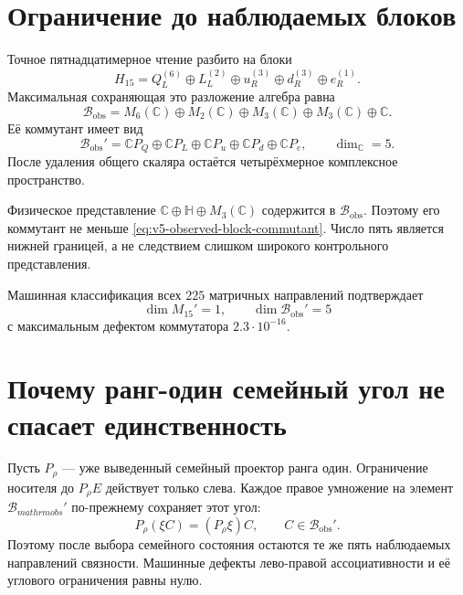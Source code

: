 \section{Ограничение до наблюдаемых блоков}

Точное пятнадцатимерное чтение разбито на блоки
\begin{equation}
 H_{15}=Q_L^{(6)}\oplus L_L^{(2)}\oplus u_R^{(3)}
 \oplus d_R^{(3)}\oplus e_R^{(1)}.
\end{equation}
Максимальная сохраняющая это разложение алгебра равна
\begin{equation}
 \mathcal B_{\mathrm{obs}}
 =M_6(\mathbb C)\oplus M_2(\mathbb C)
 \oplus M_3(\mathbb C)\oplus M_3(\mathbb C)\oplus\mathbb C.
\end{equation}
Её коммутант имеет вид
\begin{equation}
 \mathcal B_{\mathrm{obs}}'
 =\mathbb CP_Q\oplus\mathbb CP_L\oplus\mathbb CP_u
 \oplus\mathbb CP_d\oplus\mathbb CP_e,
 \qquad \dim_{\mathbb C}=5.
 \label{eq:v5-observed-block-commutant}
\end{equation}
После удаления общего скаляра остаётся четырёхмерное комплексное
пространство.

Физическое представление
$\mathbb C\oplus\mathbb H\oplus M_3(\mathbb C)$ содержится в
$\mathcal B_{\mathrm{obs}}$. Поэтому его коммутант не меньше
\eqref{eq:v5-observed-block-commutant}. Число пять является нижней границей,
а не следствием слишком широкого контрольного представления.

Машинная классификация всех $225$ матричных направлений подтверждает
\begin{equation}
 \dim M_{15}'=1,
 \qquad
 \dim\mathcal B_{\mathrm{obs}}'=5
\end{equation}
с максимальным дефектом коммутатора $2.3\cdot10^{-16}$.

\section{Почему ранг-один семейный угол не спасает единственность}

Пусть $P_\rho$ --- уже выведенный семейный проектор ранга один. Ограничение
носителя до $P_\rho E$ действует только слева. Каждое правое умножение на
элемент $\mathcal B_{mathrm{obs}}'$ по-прежнему сохраняет этот угол:
\begin{equation}
 P_\rho(\xi C)=(P_\rho\xi)C,
 \qquad C\in\mathcal B_{\mathrm{obs}}'.
\end{equation}
Поэтому после выбора семейного состояния остаются те же пять наблюдаемых
направлений связности. Машинные дефекты лево-правой ассоциативности и её
углового ограничения равны нулю.

